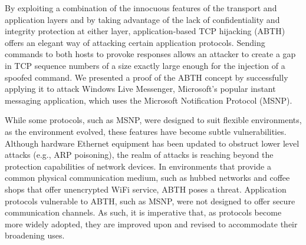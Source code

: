 \documentclass{sig-alternate}
\begin{document}
By exploiting a combination of the innocuous features of the transport and application layers and by taking advantage of the lack of confidentiality and integrity protection at either layer, application-based TCP hijacking (ABTH) offers an elegant way of attacking certain application protocols.
Sending commands to both hosts to provoke responses allows an attacker to create a gap in TCP sequence numbers of a size exactly large enough for the injection of a spoofed command.
We presented a proof of the ABTH concept by successfully applying it to attack Windows Live Messenger, Microsoft's popular instant messaging application, which uses the Microsoft Notification Protocol (MSNP).

While some protocols, such as MSNP, were designed to suit flexible environments, as the environment evolved, these features have become subtle vulnerabilities.
Although hardware Ethernet equipment has been updated to obstruct lower level attacks (e.g., ARP poisoning), the realm of attacks is reaching beyond the protection capabilities of network devices.
In environments that provide a common physical communication medium, such as hubbed networks and coffee shops that offer unencrypted WiFi service, ABTH poses a threat.
Application protocols vulnerable to ABTH, such as MSNP, were not designed to offer secure communication channels.
As such, it is imperative that, as protocols become more widely adopted, they are improved upon and revised to accommodate their broadening uses.



\end{document}
